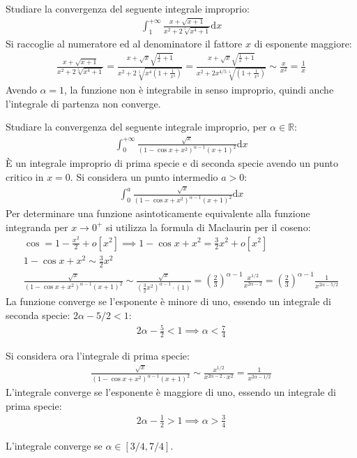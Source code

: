\documentclass{article}
\newcommand{\df}{\mathrm{d}}
\newcommand{\intab}[4]{\displaystyle\int_{#1}^{#2}{#3}\df{#4}}
\newcommand{\intpinf}[2]{\intab{0}{+\infty}{#1}{#2}}
\numberwithin{equation}{subsection}
\begin{document}
Studiare la convergenza del seguente integrale improprio:
\begin{gather*}
    \displaystyle\int_1^{+\infty}\frac{x+\sqrt{x+1}}{x^2+2\sqrt[5]{x^4+1}}\df x
\end{gather*}
Si raccoglie al numeratore ed al denominatore il fattore $x$ di esponente maggiore:
\begin{gather*}
    \displaystyle\frac{x+\sqrt{x+1}}{x^2+2\sqrt[5]{x^4+1}}=
    \frac{x+\sqrt{x}\sqrt{\frac{1}{x}+1}}{x^2+2\sqrt[5]{x^4\left(1+\frac{1}{x^4}\right)}}=
    \frac{x+\sqrt{x}\sqrt{\frac{1}{x}+1}}{x^2+2x^{4/5}\sqrt[5]{\left(1+\frac{1}{x^4}\right)}}\sim\frac{x}{x^2}=\frac{1}{x}
\end{gather*}
Avendo $\alpha=1$, la funzione non è integrabile in senso improprio, quindi anche l'integrale di partenza non converge. 



Studiare la convergenza del seguente integrale improprio, per $\alpha\in\mathbb{R}$: 
\begin{gather*}
    \intpinf{\frac{\sqrt{x}}{(1-\cos x+x^2)^{\alpha-1}(x+1)^2}}{x}
\end{gather*}
È un integrale improprio di prima specie e di seconda specie avendo un punto critico in $x=0$. Si considera un punto intermedio $a>0$:
\begin{gather*}
    \displaystyle\int_0^a\frac{\sqrt{x}}{(1-\cos x+x^2)^{\alpha-1}(x+1)^2}\df x
\end{gather*}
Per determinare una funzione asintoticamente equivalente alla funzione integranda per $x\to0^+$ si utilizza la formula di Maclaurin per il coseno:
\begin{gather*}
    \cos=1-\displaystyle\frac{x^2}{2}+o[x^2]\implies
    1-\cos x+x^2=\frac{3}{2}x^2+o[x^2]\\
    1-\cos x+x^2\sim\displaystyle\frac{3}{2}x^2\\
    \displaystyle\frac{\sqrt{x}}{(1-\cos x+x^2)^{\alpha-1}(x+1)^2}
    \sim\frac{\sqrt{x}}{(\frac{3}{2}x^2)^{\alpha-1}\cdot(1)}=\left(\frac{2}{3}\right)^{\alpha-1}\frac{x^{1/2}}{x^{2\alpha-2}}=\left(\frac{2}{3}\right)^{\alpha-1}\frac{1}{x^{2\alpha-5/2}}
\end{gather*}
La funzione converge se l'esponente è minore di uno, essendo un integrale di seconda specie: $2\alpha-5/2<1$:
\begin{gather*}
    2\alpha-\displaystyle\frac{5}{2}<1\implies\alpha<\frac{7}{4}
\end{gather*}

Si considera ora l'integrale di prima specie:
\begin{gather*}
    \displaystyle\frac{\sqrt{x}}{(1-\cos x+x^2)^{\alpha-1}(x+1)^2}\sim
    \frac{x^{1/2}}{x^{2\alpha-2}\cdot x^2}=\frac{1}{x^{2\alpha-1/2}}
\end{gather*}
L'integrale converge se l'esponente è maggiore di uno, essendo un integrale di prima specie:
\begin{gather*}
    2\alpha-\displaystyle\frac{1}{2}>1\implies\alpha>\frac{3}{4}
\end{gather*}

L'integrale converge se $\alpha\in[3/4,7/4]$. 



\end{document}
